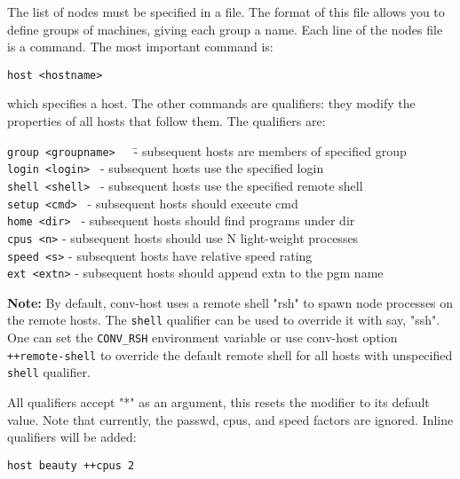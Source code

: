 \begin{itemize}
The list of nodes must be specified in a file.  The format of this file
allows you to define groups of machines, giving each group a name.
Each line of the nodes file is a command.  The most important command
is:

\begin{verbatim}
host <hostname>
\end{verbatim}

which specifies a host.  The other commands are qualifiers: they modify
the properties of all hosts that follow them.  The qualifiers are:


\begin{tabbing}
{\tt group <groupname>}~~~\= - subsequent hosts are members of specified group\\
{\tt login <login>  }     \> - subsequent hosts use the specified login\\
{\tt shell <shell>  }     \> - subsequent hosts use the specified remote 
shell\\
{\tt setup <cmd>  }       \> - subsequent hosts should execute cmd\\
{\tt home <dir> }         \> - subsequent hosts should find programs under dir\\
{\tt cpus <n>}            \> - subsequent hosts should use N light-weight processes\\
{\tt speed <s>}           \> - subsequent hosts have relative speed rating\\
{\tt ext <extn>}          \> - subsequent hosts should append extn to the pgm name\\
\end{tabbing}

{\bf Note:}
 By default, conv-host uses a remote shell "rsh" to spawn node processes
on the remote hosts. The {\tt shell} qualifier can be used to override
it with say, "ssh". One can set the {\tt CONV\_RSH} environment variable
or use conv-host option {\tt ++remote-shell} to override the default remote 
shell for all hosts with unspecified {\tt shell} qualifier.

All qualifiers accept "*" as an argument, this resets the modifier to
its default value.  Note that currently, the passwd, cpus, and speed
factors are ignored.  Inline qualifiers will be added:

\begin{verbatim}
host beauty ++cpus 2
\end{verbatim}


\end{itemize}
